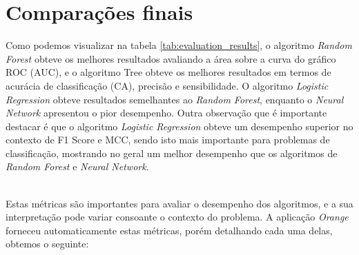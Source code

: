 \documentclass[conference]{IEEEtran}
\begin{document}
\section{Comparações finais}
Como podemos visualizar na tabela \ref{tab:evaluation_results}, o algoritmo \textit{Random Forest} obteve os melhores resultados avaliando a área sobre
a curva do gráfico ROC (AUC), e o algoritmo Tree obteve os melhores resultados em termos de acurácia de classificação (CA), precisão e sensibilidade.
O algoritmo \textit{Logistic Regression} obteve resultados semelhantes ao \textit{Random Forest}, enquanto o \textit{Neural Network} apresentou o pior desempenho.
Outra observação que é importante destacar é que o algoritmo \textit{Logistic Regression} obteve um desempenho superior no contexto de F1 Score e MCC, sendo isto mais 
importante para problemas de classificação, mostrando no geral um melhor desempenho que os algoritmos de \textit{Random Forest} e \textit{Neural Network}.
\begin{table}[!ht]
	\centering
	\caption{Comparação de Resultados dos Algoritmos}
	\label{tab:evaluation_results}

\end{table}
\\

Estas métricas são importantes para avaliar o desempenho dos algoritmos, e a sua interpretação pode variar consoante o contexto do problema.
A aplicação \textit{Orange} forneceu automaticamente estas métricas, porém detalhando cada uma delas, obtemos o seguinte:
\end{document}
